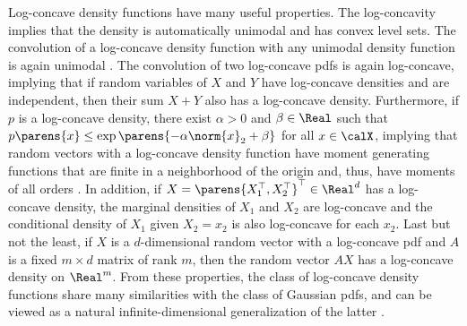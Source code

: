 \documentclass[12pt]{article}
\theoremstyle{definition}
\theoremstyle{theorem}
\theoremstyle{remark}
\begin{document}
Log-concave density functions have many useful properties. The log-concavity implies that the density is automatically unimodal and has convex level sets. The convolution of a log-concave density function with any unimodal density function is again unimodal \parencite{Ibragimov1956-nw}. The convolution of two log-concave pdfs is again log-concave, implying that if random variables of $X$ and $Y$ have log-concave densities and are independent, then their sum $X + Y$ also has a log-concave density. 
Furthermore, if $p$ is a log-concave density, there exist $\alpha > 0$ and $\beta \in \Real$ such that $p \parens{x} \le \exp \parens{- \alpha \norm{x}_2 + \beta}$ for all $x \in \calX$, implying that random vectors with a log-concave density function have moment generating functions that are finite in a neighborhood of the origin and, thus, have moments of all orders \parencite{Samworth2018-bw}. In addition, if $X = \parens{X_1^\top, X_2^\top}^\top \in \Real^d$ has a log-concave density, the marginal densities of $X_1$ and $X_2$ are log-concave and the conditional density of $X_1$ given $X_2 = x_2$ is also log-concave for each $x_2$. Last but not the least, if $X$ is a $d$-dimensional random vector with a log-concave pdf and $A$ is a fixed $m \times d$ matrix of rank $m$, then the random vector $AX$ has a log-concave density on $\Real^m$. From these properties, the class of log-concave density functions share many similarities with the class of Gaussian pdfs, and can be viewed as a natural infinite-dimensional generalization of the latter \parencite{Cule2010-lc, Samworth2018-bw}. 
\end{document}
